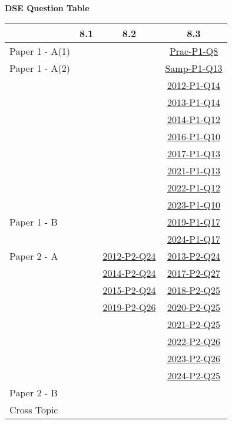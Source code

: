 \documentclass[12pt, a4paper]{article}
\begin{document}
\begin{absolutelynopagebreak}
\begin{center}
\textbf{DSE Question Table}
\end{center}
\begin{center}
\begin{tabular}{|l|c|c|c|}
\hline
        & 8.1 & 8.2 & 8.3 \\\hline
\hline
Paper 1 - A(1)&  &  & \hyperref[DSE2012P-CoreP1-Q08]{Prac-P1-Q8} \\
\hline
Paper 1 - A(2)&  &  & \hyperref[DSE2012S-CoreP1-Q13]{Samp-P1-Q13} \\
&  &  & \hyperref[DSE2012-CoreP1-Q14]{2012-P1-Q14} \\
&  &  & \hyperref[DSE2013-CoreP1-Q14]{2013-P1-Q14} \\
&  &  & \hyperref[DSE2014-CoreP1-Q12]{2014-P1-Q12} \\
&  &  & \hyperref[DSE2016-CoreP1-Q10]{2016-P1-Q10} \\
&  &  & \hyperref[DSE2017-CoreP1-Q13]{2017-P1-Q13} \\
&  &  & \hyperref[DSE2021-CoreP1-Q13]{2021-P1-Q13} \\
&  &  & \hyperref[DSE2022-CoreP1-Q12]{2022-P1-Q12} \\
&  &  & \hyperref[DSE2023-CoreP1-Q10]{2023-P1-Q10} \\
\hline
Paper 1 - B&  &  & \hyperref[DSE2019-CoreP1-Q17]{2019-P1-Q17} \\
&  &  & \hyperref[DSE2024-CoreP1-Q17]{2024-P1-Q17} \\
\hline
\hline
Paper 2 - A&  & \hyperref[DSE2012-CoreP2-Q24]{2012-P2-Q24} & \hyperref[DSE2013-CoreP2-Q24]{2013-P2-Q24} \\
&  & \hyperref[DSE2014-CoreP2-Q24]{2014-P2-Q24} & \hyperref[DSE2017-CoreP2-Q27]{2017-P2-Q27} \\
&  & \hyperref[DSE2015-CoreP2-Q24]{2015-P2-Q24} & \hyperref[DSE2018-CoreP2-Q25]{2018-P2-Q25} \\
&  & \hyperref[DSE2019-CoreP2-Q26]{2019-P2-Q26} & \hyperref[DSE2020-CoreP2-Q25]{2020-P2-Q25} \\
&  &  & \hyperref[DSE2021-CoreP2-Q25]{2021-P2-Q25} \\
&  &  & \hyperref[DSE2022-CoreP2-Q26]{2022-P2-Q26} \\
&  &  & \hyperref[DSE2023-CoreP2-Q26]{2023-P2-Q26} \\
&  &  & \hyperref[DSE2024-CoreP2-Q25]{2024-P2-Q25} \\
\hline
Paper 2 - B&  &  &  \\
\hline
\hline
Cross Topic&  &  &  \\
\hline
\end{tabular}
\end{center}
\end{absolutelynopagebreak}
\end{document}
